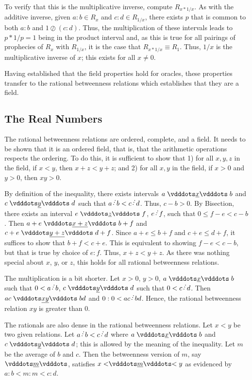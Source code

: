 \documentclass[12pt]{article}
\begin{document}
\begin{enumerate}
    To verify that this is the multiplicative inverse, compute $R_{x*1/x}$. As with the additive inverse, given $a:b \in R_x$ and $c:d \in R_{1/x}$, there exists $p$ that is common to both $a:b$ and $1 \oslash (c:d)$. Thus, the multiplication of these intervals leads to $p *1/p = 1$ being in the product interval and, as this is true for all pairings of prophecies of $R_{x}$ with $R_{1/x}$, it is the case that $R_{x*1/x} \equiv R_1$. Thus, $1/x$ is the multiplicative inverse of $x$; this exists for all $x \neq 0$. 

\end{enumerate}

Having established that the field properties hold for oracles, these properties transfer to the rational betweenness relations which establishes that they are a field. 


\subsection{The Real Numbers}

The rational betweenness relations are ordered, complete, and a field. It needs to be shown that it is an ordered field, that is, that the arithmetic operations respects the ordering. To do this, it is sufficient to show that 1) for all $x, y, z$ in the field, if $x<y$, then $x + z < y +z$; and 2) for all $x, y$ in the field, if $x >0$ and $y>0$, then $xy > 0 $.

By definition of the inequality, there exists intervals $ a \xrel[x] b$ and $c \xrel[y] d$ such that $a \lte b < c \lte d$. Thus, $c-b > 0$. By Bisection, there exists an interval $e \xrel[z] f$, $e \lte f$, such that $0 \leq f-e < c-b$. Then $a+e \xrel[x+z] b+f$ and $c+e \xrel[y+z] d+f$. Since $a+e \leq  b+f$ and $c+e \leq d+f$, it suffices to show that $b+f < c+e$. This is equivalent to showing $f-e < c-b$, but that is true by choice of $e:f$. Thus, $x+z < y+z$. As there was nothing special about $x$, $y$, or $z$, this holds for all rational betweenness relations. 

The multiplication is a bit shorter. Let $x >0 $, $y >0$, $a \xrel b$ such that $0<a \lte b$, $c \xrel[y] d$ such that $0 < c \lte d$. Then $ac \xrel[xy] bd$ and $0:0 < ac \lte bd$. Hence, the rational betweenness relation $xy$ is greater than 0. 

The rationals are also dense in the rational betweenness relations. Let $x < y$ be two given relations. Let $a \lte b < c \lte d$ where $a \xrel b$ and $c \xrel[y] d$; this is allowed by the meaning of the inequality. Let $m$ be the average of $b$ and $c$. Then the betweenness version of $m$, say $\xrel[m]$, satisfies $x < \xrel[m] < y$ as evidenced by $a:b < m:m < c:d$.
\end{document}
